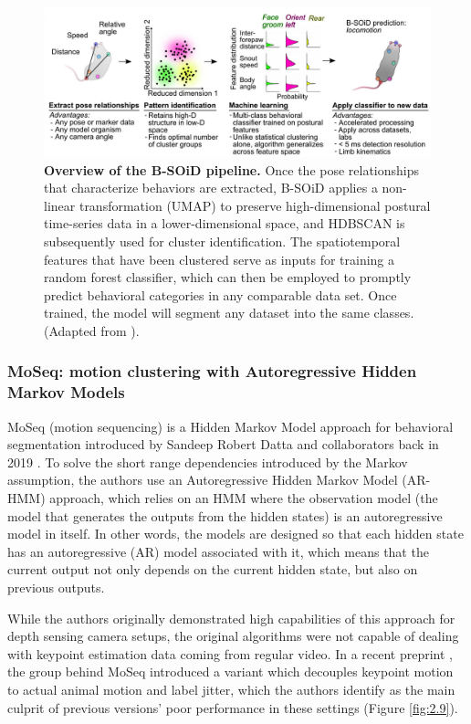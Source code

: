 \begin{figure}[!thb]
\centering
\includegraphics[width=\textwidth]{Figures/sota_8.pdf}

\caption[\textbf{Overview of the B-SOiD pipeline}]{\textbf{Overview of the B-SOiD pipeline.} Once the pose relationships that characterize behaviors are extracted, B-SOiD applies a non-linear transformation (UMAP) to preserve high-dimensional postural time-series data in a lower-dimensional space, and HDBSCAN is subsequently used for cluster identification. The spatiotemporal features that have been clustered serve as inputs for training a random forest classifier, which can then be employed to promptly predict behavioral categories in any comparable data set. Once trained, the model will segment any dataset into the same classes. (Adapted from \cite{Hsu2021B-SOiDBehaviors}).}
\label{fig:2.8}

\end{figure}

\subsubsection{MoSeq: motion clustering with Autoregressive Hidden Markov Models}

MoSeq (motion sequencing) is a Hidden Markov Model approach for behavioral segmentation introduced by Sandeep Robert Datta and collaborators back in 2019 \cite{Datta2015QA:Behavior}. To solve the short range dependencies introduced by the Markov assumption, the authors use an Autoregressive Hidden Markov Model (AR-HMM) approach, which relies on an HMM where the observation model (the model that generates the outputs from the hidden states) is an autoregressive model in itself. In other words, the models are designed so that each hidden state has an autoregressive (AR) model associated with it, which means that the current output not only depends on the current hidden state, but also on previous outputs.

While the authors originally demonstrated high capabilities of this approach for depth sensing camera setups, the original algorithms were not capable of dealing with keypoint estimation data coming from regular video. In a recent preprint \cite{Weinreb2023Keypoint-MoSeq:Dynamics}, the group behind MoSeq introduced a variant which decouples keypoint motion to actual animal motion and label jitter, which the authors identify as the main culprit of previous versions' poor performance in these settings (Figure \ref{fig:2.9}). 

